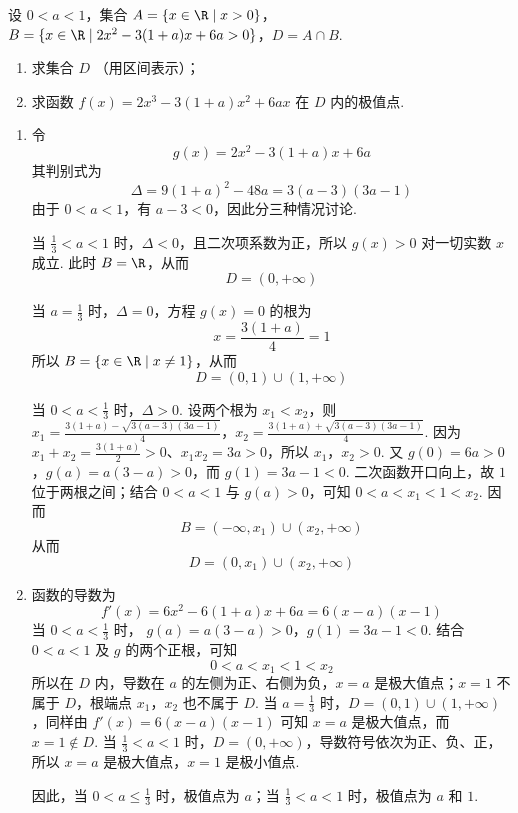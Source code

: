 \begin{problem}
设 \(0 < a < 1\)，集合 \(A = \{x \in \R \mid x > 0\}\)，\(B = \{x \in \R \mid 2x^2 - 3(1 + a)x + 6a > 0\}\)，\(D = A \cap B\).
\begin{enumerate}
\item 求集合 \(D\) （用区间表示）；
\item 求函数 \( f(x) = 2x^{3} - 3(1 + a)x^{2} + 6ax \) 在 \(D\) 内的极值点.
\end{enumerate}
\end{problem}

\begin{solution}
\begin{enumerate}
\item 令
\[
g(x)=2x^2-3(1+a)x+6a
\]
其判别式为
\[
\Delta=9(1+a)^2-48a=3(a-3)(3a-1)
\]
由于 \(0<a<1\)，有 \(a-3<0\)，因此分三种情况讨论.

当 \(\frac13<a<1\) 时，\(\Delta<0\)，且二次项系数为正，所以 \(g(x)>0\) 对一切实数 \(x\) 成立. 此时 \(B=\R\)，从而
\[
D=(0,+\infty)
\]

当 \(a=\frac13\) 时，\(\Delta=0\)，方程 \(g(x)=0\) 的根为
\[
x=\frac{3(1+a)}4=1
\]
所以 \(B=\{x\in\R\mid x\ne1\}\)，从而
\[
D=(0,1)\cup(1,+\infty)
\]

当 \(0<a<\frac13\) 时，\(\Delta>0\). 设两个根为 \(x_1<x_2\)，则
\(x_{1} = \frac{3(1+a)-\sqrt{3(a-3)(3a-1)}}{4}\)，\(x_{2} = \frac{3(1+a)+\sqrt{3(a-3)(3a-1)}}{4}\).
因为 \(x_1+x_2=\frac{3(1+a)}2>0\)、\(x_1x_2=3a>0\)，所以 \(x_1\)，\(x_2>0\). 又 \(g(0)=6a>0\)，\(g(a)=a(3-a)>0\)，而 \(g(1)=3a-1<0\). 二次函数开口向上，故 \(1\) 位于两根之间；结合 \(0<a<1\) 与 \(g(a)>0\)，可知 \(0<a<x_1<1<x_2\). 因而
\[
B=(-\infty,x_1)\cup(x_2,+\infty)
\]
从而
\[
D=(0,x_1)\cup(x_2,+\infty)
\]
\item 函数的导数为
\[
f'(x)=6x^2-6(1+a)x+6a=6(x-a)(x-1)
\]
当 \(0<a<\frac13\) 时，
\(g(a)=a(3-a)>0\)，\(g(1)=3a-1<0\).
结合 \(0<a<1\) 及 \(g\) 的两个正根，可知
\[
0<a<x_1<1<x_2
\]
所以在 \(D\) 内，导数在 \(a\) 的左侧为正、右侧为负，\(x=a\) 是极大值点；\(x=1\) 不属于 \(D\)，根端点 \(x_1\)，\(x_2\) 也不属于 \(D\). 当 \(a=\frac13\) 时，\(D=(0,1)\cup(1,+\infty)\)，同样由 \(f'(x)=6(x-a)(x-1)\) 可知 \(x=a\) 是极大值点，而 \(x=1\notin D\). 当 \(\frac13<a<1\) 时，\(D=(0,+\infty)\)，导数符号依次为正、负、正，所以 \(x=a\) 是极大值点，\(x=1\) 是极小值点.

因此，当 \(0<a\leqslant\frac13\) 时，极值点为 \(a\)；当 \(\frac13<a<1\) 时，极值点为 \(a\) 和 \(1\).
\end{enumerate}
\end{solution}
